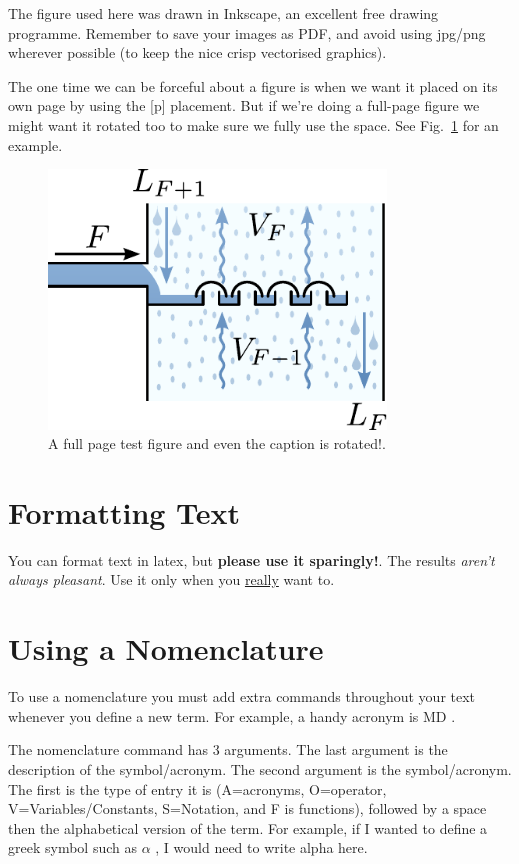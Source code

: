 \documentclass[12pt,MEng]{UoAThesis}
\begin{document}
The figure used here was drawn in Inkscape, an excellent free drawing
programme. Remember to save your images as PDF, and avoid using
jpg/png wherever possible (to keep the nice crisp vectorised graphics).

The one time we can be forceful about a figure is when we want it
placed on its own page by using the [p] placement. But if we're
doing a full-page figure we might want it rotated too to make sure we
fully use the space. See Fig.~\ref{fig:testfig2} for an example.
\begin{figure}
  \centering
  \includegraphics[clip,width=0.8\textwidth]{figures/testfig}
  \caption{\label{fig:testfig2} A full page test figure and even the caption is rotated!.}
\end{figure}

\section{Formatting Text}
You can format text in latex, but {\bf please use it sparingly!}. The
results {\em aren't always pleasant}. Use it only when you
\underline{really} want to.

\section{Using a Nomenclature}
To use a nomenclature you must add extra commands throughout your text
whenever you define a new term. For example, a handy acronym is MD
. 

The nomenclature command has 3 arguments. The last argument is the
description of the symbol/acronym. The second argument is the
symbol/acronym. The first is the type of entry it is (A=acronyms,
O=operator, V=Variables/Constants, S=Notation, and F is functions),
followed by a space then the alphabetical version of the term. For
example, if I wanted to define a greek symbol such as $\alpha$
, I would need to write alpha
here.
\end{document}
